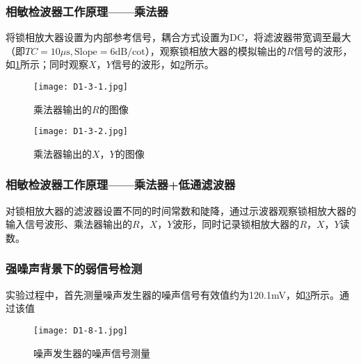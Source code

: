 \documentclass[dvipsnames, svgnames,a4paper,11pt]{article}
\begin{document}
	\subsubsection{相敏检波器工作原理——乘法器}

	将锁相放大器设置为内部参考信号，耦合方式设置为DC，将滤波器带宽调至最大（即$TC = 10 \mu\text{s}, \text{Slope} = 6 \text{dB/cot}$），观察锁相放大器的模拟输出的$R$信号的波形，如\cref{fig:D1-3-1}所示；同时观察$X$，$Y$信号的波形，如\cref{fig:D1-3-2}所示。

	\begin{figure}[htbp]
		\centering
		\texttt{[image: D1-3-1.jpg]}
		\caption{乘法器输出的$R$的图像}
		\label{fig:D1-3-1}
	\end{figure}


	\begin{figure}[htbp]
		\centering
		\texttt{[image: D1-3-2.jpg]}
		\caption{乘法器输出的$X$，$Y$的图像}
		\label{fig:D1-3-2}
	\end{figure}







	\subsubsection{相敏检波器工作原理——乘法器+低通滤波器}

	对锁相放大器的滤波器设置不同的时间常数和陡降，通过示波器观察锁相放大器的输入信号波形、乘法器输出的$R$，$X$，$Y$波形，同时记录锁相放大器的$R$，$X$，$Y$读数。













	\subsubsection{强噪声背景下的弱信号检测}

	实验过程中，首先测量噪声发生器的噪声信号有效值约为120.1mV，如\cref{fig:D1-8-1}所示。通过该值

	\begin{figure}[htbp]
		\centering
		\texttt{[image: D1-8-1.jpg]}
		\caption{噪声发生器的噪声信号测量}
		\label{fig:D1-8-1}
	\end{figure}
\end{document}
